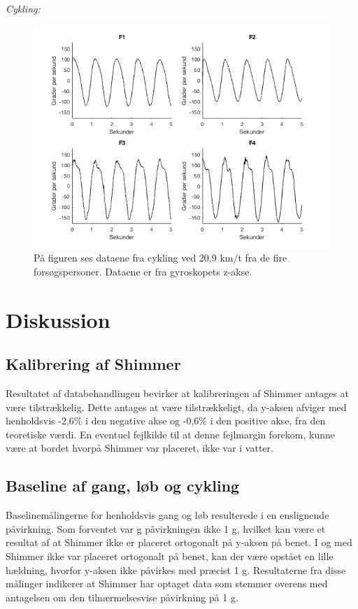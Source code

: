 \textit{Cykling:}
\begin{figure}[H]
	\centering
	\includegraphics[scale=0.5]{figures/qBilag/cykling_gyro}
	\caption{På figuren ses dataene fra cykling ved 20,9 km/t fra de fire forsøgspersoner. Dataene er fra gyroskopets z-akse.}
	\label{fig:Ap_cykling}
\end{figure}

\section{Diskussion}
\subsection{Kalibrering af Shimmer}
Resultatet af databehandlingen bevirker at kalibreringen af Shimmer antages at være tilstrækkelig. Dette antages at være tilstrækkeligt, da y-aksen  afviger med henholdsvis -2,6\% i den negative akse og -0,6\% i den positive akse, fra den teoretiske værdi. En eventuel fejlkilde til at denne fejlmargin forekom, kunne være at bordet hvorpå Shimmer var placeret, ikke var i vatter.

\subsection{Baseline af gang, løb og cykling}
Baselinemålingerne for henholdsvis gang og løb resulterede i en enslignende påvirkning. Som forventet var g påvirkningen ikke 1 g, hvilket kan være et resultat af at Shimmer ikke er placeret ortogonalt på y-aksen på benet. I og med Shimmer ikke var placeret ortogonalt på benet, kan der være opstået en lille hældning, hvorfor y-aksen ikke påvirkes med præcist 1 g. Resultaterne fra disse målinger indikerer at Shimmer har optaget data som stemmer overens med antagelsen om den tilnærmelsesvise påvirkning på 1 g. 

